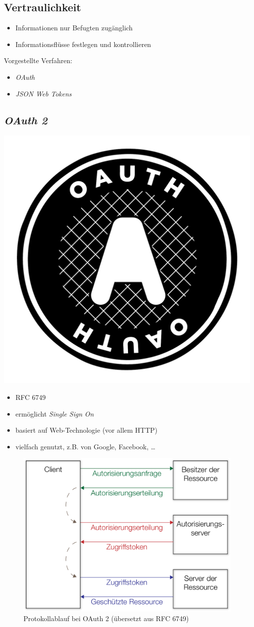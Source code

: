 \documentclass{beamer}
\begin{document}
\subsection{Vertraulichkeit}
\begin{frame}{\insertsubsection}
	\begin{itemize}
		\setlength\itemsep{1em}
		\item Informationen nur Befugten zugänglich
		\item Informationsflüsse festlegen und kontrollieren
	\end{itemize}
	\vspace*{1cm}
	\pause
	Vorgestellte Verfahren:
	\begin{itemize}
		\item \textit{OAuth}
		\item \textit{JSON Web Tokens}
	\end{itemize}
\end{frame}

\subsection{\em OAuth 2}
\begin{frame}{\insertsubsection}
	\centering
	\includegraphics[width=.3\linewidth]{img/oauth}
	\vspace*{12pt}
	\begin{itemize}
		\item RFC 6749 \cite{RFC6749}
		\item ermöglicht \textit{Single Sign On}
		\item basiert auf Web-Technologie (vor allem HTTP)
		\item vielfach genutzt, z.B. von Google, Facebook, …
	\end{itemize}
\end{frame}	

\begin{frame}{\insertsubsection}
	\begin{figure}
		\centering
		\includegraphics[width=.52\linewidth]{img/OAuth2}
		\caption{Protokollablauf bei OAuth 2 (übersetzt aus RFC 6749)}
	\end{figure}
\end{frame}
	
\end{document}
